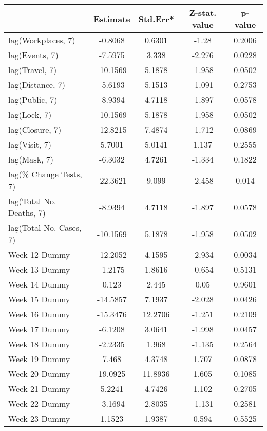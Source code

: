 \begingroup\tiny
\begin{longtable}{lcccc}
  \toprule
 & Estimate & Std.Err* & Z-stat. value & p-value \\ 
  \midrule
lag(Workplaces, 7) & -0.8068 & 0.6301 & -1.28 & 0.2006 \\ 
  lag(Events, 7) & -7.5975 & 3.338 & -2.276 & 0.0228 \\ 
  lag(Travel, 7) & -10.1569 & 5.1878 & -1.958 & 0.0502 \\ 
  lag(Distance, 7) & -5.6193 & 5.1513 & -1.091 & 0.2753 \\ 
  lag(Public, 7) & -8.9394 & 4.7118 & -1.897 & 0.0578 \\ 
  lag(Lock, 7) & -10.1569 & 5.1878 & -1.958 & 0.0502 \\ 
  lag(Closure, 7) & -12.8215 & 7.4874 & -1.712 & 0.0869 \\ 
  lag(Visit, 7) & 5.7001 & 5.0141 & 1.137 & 0.2555 \\ 
  lag(Mask, 7) & -6.3032 & 4.7261 & -1.334 & 0.1822 \\ 
  lag(\% Change Tests, 7) & -22.3621 & 9.099 & -2.458 & 0.014 \\ 
  lag(Total No. Deaths, 7) & -8.9394 & 4.7118 & -1.897 & 0.0578 \\ 
  lag(Total No. Cases, 7) & -10.1569 & 5.1878 & -1.958 & 0.0502 \\ 
  Week 12 Dummy & -12.2052 & 4.1595 & -2.934 & 0.0034 \\ 
  Week 13 Dummy & -1.2175 & 1.8616 & -0.654 & 0.5131 \\ 
  Week 14 Dummy & 0.123 & 2.445 & 0.05 & 0.9601 \\ 
  Week 15 Dummy & -14.5857 & 7.1937 & -2.028 & 0.0426 \\ 
  Week 16 Dummy & -15.3476 & 12.2706 & -1.251 & 0.2109 \\ 
  Week 17 Dummy & -6.1208 & 3.0641 & -1.998 & 0.0457 \\ 
  Week 18 Dummy & -2.2335 & 1.968 & -1.135 & 0.2564 \\ 
  Week 19 Dummy & 7.468 & 4.3748 & 1.707 & 0.0878 \\ 
  Week 20 Dummy & 19.0925 & 11.8936 & 1.605 & 0.1085 \\ 
  Week 21 Dummy & 5.2241 & 4.7426 & 1.102 & 0.2705 \\ 
  Week 22 Dummy & -3.1694 & 2.8035 & -1.131 & 0.2581 \\ 
  Week 23 Dummy & 1.1523 & 1.9387 & 0.594 & 0.5525 \\ 

\end{longtable}
